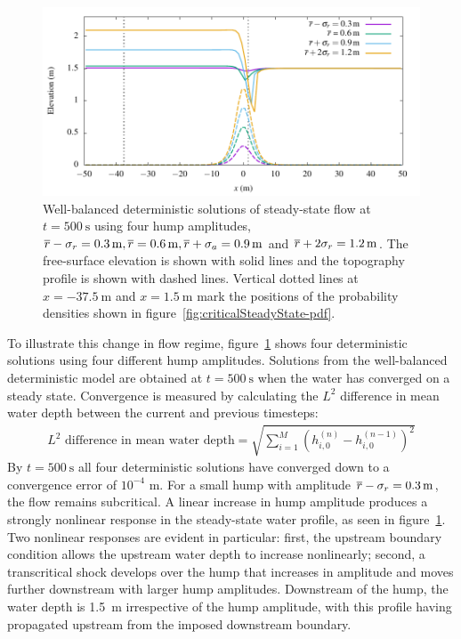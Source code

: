 \begin{figure}
    \centering
    \includegraphics{fig-criticalSteadyState-examples.pdf}
    \caption{Well-balanced deterministic solutions of steady-state flow at $t = \SI{500}{\second}$ using four hump amplitudes, $\overline{r} - \sigma_r = \SI{0.3}{\meter}, \overline{r} = \SI{0.6}{\meter}, \overline{r}+\sigma_a = \SI{0.9}{\meter}$ and $\overline{r} + 2\sigma_r = \SI{1.2}{\meter}$.
    The free-surface elevation is shown with solid lines and the topography profile is shown with dashed lines.
    Vertical dotted lines at $x = \SI{-37.5}{\meter}$ and $x = \SI{1.5}{\meter}$ mark the positions of the probability densities shown in figure~\ref{fig:criticalSteadyState-pdf}.}
    \label{fig:criticalSteadyState-examples}
\end{figure}

To illustrate this change in flow regime, figure~\ref{fig:criticalSteadyState-examples} shows four deterministic solutions using four different hump amplitudes.
Solutions from the well-balanced deterministic model are obtained at $t = \SI{500}{\second}$ when the water has converged on a steady state.
Convergence is measured by calculating the $L^2$ difference in mean water depth between the current and previous timesteps:
\begin{align}
    L^2 \text{ difference in mean water depth} = \sqrt{\sum_{i=1}^M \left(h_{i,0}^{(n)} - h_{i,0}^{(n-1)}\right)^2} \label{eqn:convergence}
\end{align}
By $t = \SI{500}{\second}$ all four deterministic solutions have converged down to a convergence error of $10^{-4}$ \si{\meter}.
For a small hump with amplitude $\overline{r} - \sigma_r = \SI{0.3}{\meter}$, the flow remains subcritical.
A linear increase in hump amplitude produces a strongly nonlinear response in the steady-state water profile, as seen in figure~\ref{fig:criticalSteadyState-examples}. 
Two nonlinear responses are evident in particular: first, the upstream boundary condition allows the upstream water depth to increase nonlinearly; second, a transcritical shock develops over the hump that increases in amplitude and moves further downstream with larger hump amplitudes.
Downstream of the hump, the water depth is \SI{1.5}{\meter} irrespective of the hump amplitude, with this profile having propagated upstream from the imposed downstream boundary.


